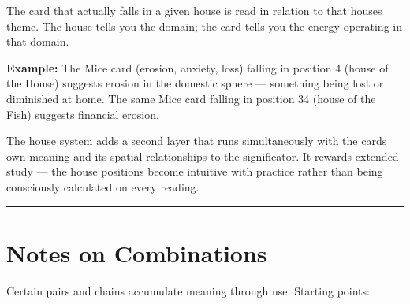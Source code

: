 The card that actually falls in a given house is read in relation to that house\textquotesingle s theme. The house tells you the domain; the card tells you the energy operating in that domain.

\textbf{Example:} The Mice card (erosion, anxiety, loss) falling in position 4 (house of the House) suggests erosion in the domestic sphere --- something being lost or diminished at home. The same Mice card falling in position 34 (house of the Fish) suggests financial erosion.

The house system adds a second layer that runs simultaneously with the card\textquotesingle s own meaning and its spatial relationships to the significator. It rewards extended study --- the house positions become intuitive with practice rather than being consciously calculated on every reading.

\begin{center}\rule{0.5\linewidth}{0.5pt}\end{center}

\section{Notes on Combinations}\label{notes-on-combinations}

Certain pairs and chains accumulate meaning through use. Starting points:

